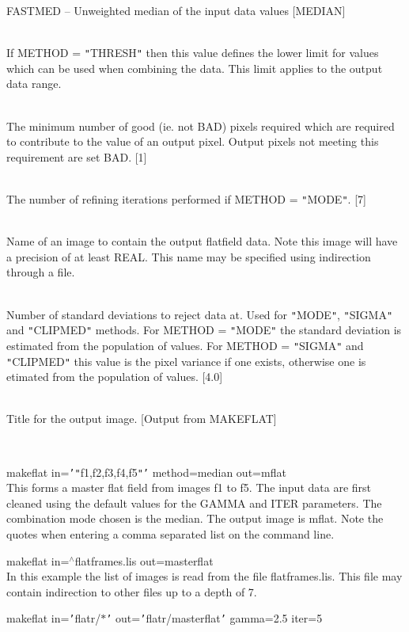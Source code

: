 \documentclass[twoside,11pt]{article}
\renewcommand{\_}{\texttt{\symbol{95}}}
\newcommand{\qt}[1]{{\tt "}#1{\tt "}}
\newcommand{\qs}[1]{{\tt '}#1{\tt '}}
\newcommand{\sstexamples}[1]{
   \item[Examples:] \mbox{} \\
   \vspace{-3.5ex}
   \begin{description}
      #1
   \end{description}
}
\newcommand{\sstsubsection}[1]{ \item[{#1}] \mbox{} \\}
\newcommand{\sstexamplesubsection}[2]{\sloppy \item{\ssttt #1} \mbox{} \\ #2 }
\newcommand{\sstitem}{\item}
\newcommand{\sstexamples}[1]{
      \item[Examples:] \\
      \begin{description}
         #1
      \end{description}
      \\
   }
\newcommand{\sstsubsection}[1]{\item[{#1}]}
\newcommand{\sstexamplesubsection}[2]{\item[{\ssttt #1}] #2}
\newcommand{\sstitem}{\item}
\begin{document}
{{{{            \sstitem
               FASTMED   -- Unweighted median of the input data values
            [MEDIAN]
         }
      }
      \sstsubsection{
         MIN = \_REAL (Read)
      } {
         If METHOD = \qt{THRESH} then this value defines the lower limit
         for values which can be used when combining the data. This
         limit applies to the output data range.
      }
      \sstsubsection{
         MINPIX = \_INTEGER (Read)
      } {
         The minimum number of good (ie. not BAD) pixels required which
         are required to contribute to the value of an output pixel.
         Output pixels not meeting this requirement are set BAD.
         [1]
      }
      \sstsubsection{
         NITER = \_INTEGER (Read)
      } {
         The number of refining iterations performed if METHOD = \qt{MODE}.
         [7]
      }
      \sstsubsection{
         OUT = LITERAL (Write)
      } {
         Name of an image to contain the output flatfield data. Note this
         image will have a precision of at least \_REAL. This name may be
         specified using indirection through a file.
      }
      \sstsubsection{
         SIGMAS = \_REAL (Read)
      } {
         Number of standard deviations to reject data at. Used for
         \qt{MODE}, \qt{SIGMA} and \qt{CLIPMED} methods. For METHOD =
         \qt{MODE} the standard deviation is estimated from the
         population of values. For METHOD = \qt{SIGMA} and
         \qt{CLIPMED} this value is the pixel variance if one exists,
         otherwise one is etimated from the population of values.
         [4.0]
      }
      \sstsubsection{
         TITLE = LITERAL (Read)
      } {
         Title for the output image.
         [Output from MAKEFLAT]
      }
   }
   \sstexamples{
      \sstexamplesubsection{
         makeflat in=\qs{\qt{f1,f2,f3,f4,f5}} method=median out=mflat
      } {
         This forms a master flat field from images f1 to f5. The input
         data are first cleaned using the default values for the GAMMA
         and ITER parameters. The combination mode chosen is the
         median.  The output image is mflat. Note the quotes when
         entering a comma separated list on the command line.
      }
      \sstexamplesubsection{
         makeflat in=$^\wedge$flat\_frames.lis out=master\_flat
      } {
         In this example the list of images is read from the file
         flat\_frames.lis. This file may contain indirection to other files
         up to a depth of 7.
      }
      \sstexamplesubsection{
         makeflat in=\qs{flatr/$*$} out=\qs{flatr/master\_flat}
         gamma=2.5 iter=5
}}}
\end{document}
